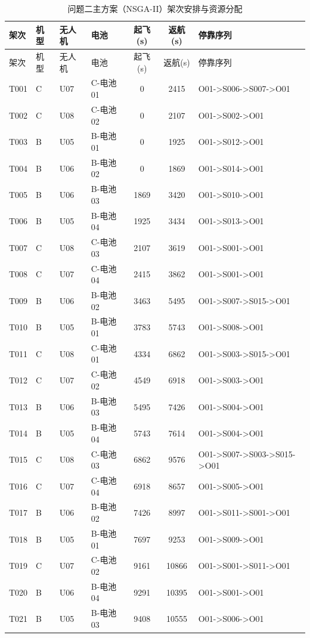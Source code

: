 ﻿\begin{center}\small\renewcommand{\arraystretch}{1.05}
\begin{longtable}{llllccl}
\caption{问题二主方案（NSGA-II）架次安排与资源分配}\label{app:q2_sorties}\\
\hline
架次 & 机型 & 无人机 & 电池 & 起飞(s) & 返航(s) & 停靠序列 \\
\hline\endfirsthead
\hline 架次 & 机型 & 无人机 & 电池 & 起飞(s) & 返航(s) & 停靠序列 \\\hline\endhead
T001 & C & U07 & C-电池01 & 0 & 2415 & O01->S006->S007->O01 \\
T002 & C & U08 & C-电池02 & 0 & 2107 & O01->S002->O01 \\
T003 & B & U05 & B-电池01 & 0 & 1925 & O01->S012->O01 \\
T004 & B & U06 & B-电池02 & 0 & 1869 & O01->S014->O01 \\
T005 & B & U06 & B-电池03 & 1869 & 3420 & O01->S010->O01 \\
T006 & B & U05 & B-电池04 & 1925 & 3434 & O01->S013->O01 \\
T007 & C & U08 & C-电池03 & 2107 & 3619 & O01->S001->O01 \\
T008 & C & U07 & C-电池04 & 2415 & 3862 & O01->S001->O01 \\
T009 & B & U06 & B-电池02 & 3463 & 5495 & O01->S007->S015->O01 \\
T010 & B & U05 & B-电池01 & 3783 & 5743 & O01->S008->O01 \\
T011 & C & U08 & C-电池01 & 4334 & 6862 & O01->S003->S015->O01 \\
T012 & C & U07 & C-电池02 & 4549 & 6918 & O01->S003->O01 \\
T013 & B & U06 & B-电池03 & 5495 & 7426 & O01->S004->O01 \\
T014 & B & U05 & B-电池04 & 5743 & 7614 & O01->S004->O01 \\
T015 & C & U08 & C-电池03 & 6862 & 9576 & O01->S007->S003->S015->O01 \\
T016 & C & U07 & C-电池04 & 6918 & 8657 & O01->S005->O01 \\
T017 & B & U06 & B-电池02 & 7426 & 8997 & O01->S011->S001->O01 \\
T018 & B & U05 & B-电池01 & 7697 & 9253 & O01->S009->O01 \\
T019 & C & U07 & C-电池02 & 9161 & 10866 & O01->S001->S011->O01 \\
T020 & B & U06 & B-电池04 & 9291 & 10395 & O01->S001->O01 \\
T021 & B & U05 & B-电池03 & 9408 & 10555 & O01->S006->O01 \\

\end{longtable}
\end{center}
